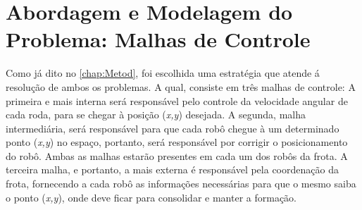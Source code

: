 %
%

\chapter{Abordagem e Modelagem do Problema: Malhas de Controle}
\label{chap:abordagememdelo}



Como já dito no \autoref{chap:Metod}, foi escolhida uma estratégia que atende á resolução de ambos os problemas. A qual, consiste em três malhas de controle: A primeira e mais interna será responsável pelo controle da velocidade angular de cada roda, para se chegar à posição (\emph{x,y}) desejada. A segunda, malha intermediária, será responsável para que cada robô chegue à um determinado ponto (\emph{x,y}) no espaço, portanto, será responsável por corrigir o posicionamento do robô. Ambas as malhas estarão presentes em cada um dos robôs da frota. A terceira malha, e portanto, a mais externa é responsável pela coordenação da frota, fornecendo a cada robô as informações necessárias para que o mesmo saiba o ponto (\emph{x,y}), onde deve ficar para consolidar e manter a formação.

